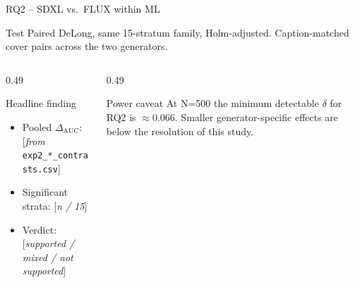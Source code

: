 \documentclass[aspectratio=169,11pt]{beamer}
\begin{document}
\begin{frame}{RQ2 -- SDXL vs.\ FLUX within ML}
\small
\begin{block}{Test}
Paired DeLong, same 15-stratum family, Holm-adjusted. Caption-matched cover pairs across the two generators.
\end{block}
\begin{columns}[T]
\begin{column}{0.49\textwidth}
\begin{block}{Headline finding}
\begin{itemize}
\item Pooled $\Delta_\text{AUC}$: [\textit{from} \texttt{exp2\_*\_contrasts.csv}]
\item Significant strata: [\textit{n / 15}]
\item Verdict: [\textit{supported / mixed / not supported}]
\end{itemize}
\end{block}
\end{column}
\begin{column}{0.49\textwidth}
\begin{block}{Power caveat}
At N=500 the minimum detectable $\delta$ for RQ2 is $\approx 0.066$. Smaller generator-specific effects are below the resolution of this study.
\end{block}
\end{column}
\end{columns}
\end{frame}
\end{document}
